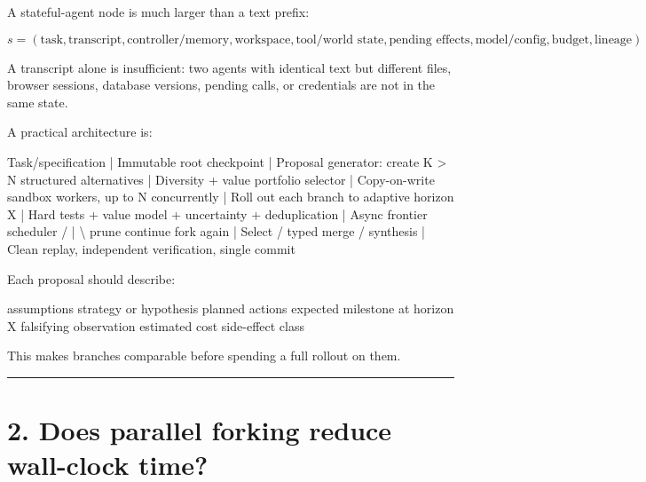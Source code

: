 \documentclass[
  letterpaper,
]{article}
\newenvironment{Shaded}{}{}
\newcommand{\NormalTok}[1]{#1}
\begin{document}
A stateful-agent node is much larger than a text prefix:

\[
s = (\text{task}, \text{transcript}, \text{controller/memory},
\text{workspace}, \text{tool/world state}, \text{pending effects},
\text{model/config}, \text{budget}, \text{lineage})
\]

A transcript alone is insufficient: two agents with identical text but different files, browser sessions, database versions, pending calls, or credentials are not in the same state.

A practical architecture is:

\begin{Shaded}
\begin{Highlighting}[]
\NormalTok{Task/specification}
\NormalTok{       |}
\NormalTok{Immutable root checkpoint}
\NormalTok{       |}
\NormalTok{Proposal generator: create K \textgreater{} N structured alternatives}
\NormalTok{       |}
\NormalTok{Diversity + value portfolio selector}
\NormalTok{       |}
\NormalTok{Copy{-}on{-}write sandbox workers, up to N concurrently}
\NormalTok{       |}
\NormalTok{Roll out each branch to adaptive horizon X}
\NormalTok{       |}
\NormalTok{Hard tests + value model + uncertainty + deduplication}
\NormalTok{       |}
\NormalTok{Async frontier scheduler}
\NormalTok{   /       |       \textbackslash{}}
\NormalTok{prune   continue   fork again}
\NormalTok{       |}
\NormalTok{Select / typed merge / synthesis}
\NormalTok{       |}
\NormalTok{Clean replay, independent verification, single commit}
\end{Highlighting}
\end{Shaded}

Each proposal should describe:

\begin{Shaded}
\begin{Highlighting}[]
\NormalTok{assumptions}
\NormalTok{strategy or hypothesis}
\NormalTok{planned actions}
\NormalTok{expected milestone at horizon X}
\NormalTok{falsifying observation}
\NormalTok{estimated cost}
\NormalTok{side{-}effect class}
\end{Highlighting}
\end{Shaded}

This makes branches comparable before spending a full rollout on them.

\begin{center}\rule{0.5\linewidth}{0.5pt}\end{center}

\section{2. Does parallel forking reduce wall-clock time?}\label{does-parallel-forking-reduce-wall-clock-time}
\end{document}
